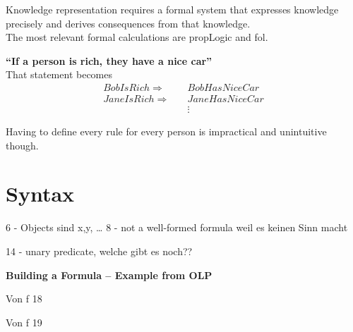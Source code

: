 

Knowledge representation requires a formal system that expresses knowledge precisely and derives consequences from
that knowledge.\cite{elcock1987} \\
The most relevant formal calculations are \gls{propLogic} and \gls{fol}. %

\begin{bsp} \textbf{``If a person is rich, they have a nice car''} \\
    That statement becomes
    \begin{align*}
        BobIsRich  \Rightarrow & \quad  BobHasNiceCar \\
        JaneIsRich  \Rightarrow & \quad JaneHasNiceCar \\
        & \quad \vdots
    \end{align*}
\end{bsp}
\noindent Having to define every rule for every person is impractical and unintuitive though.


\section{Syntax}\label{sec:syntax}




6 - Objects sind x,y, \ldots
8 - not a well-formed formula weil es keinen Sinn macht


14 - unary predicate, welche gibt es noch??




\begin{bsp} \textbf{Building a Formula -- Example from OLP}
\end{bsp}


\begin{bsp}
    Von f 18
\end{bsp}


\begin{bsp}
    Von f 19
\end{bsp}

